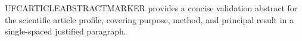UFCARTICLEABSTRACTMARKER provides a concise validation abstract for the scientific article profile, covering purpose, method, and principal result in a single-spaced justified paragraph.

